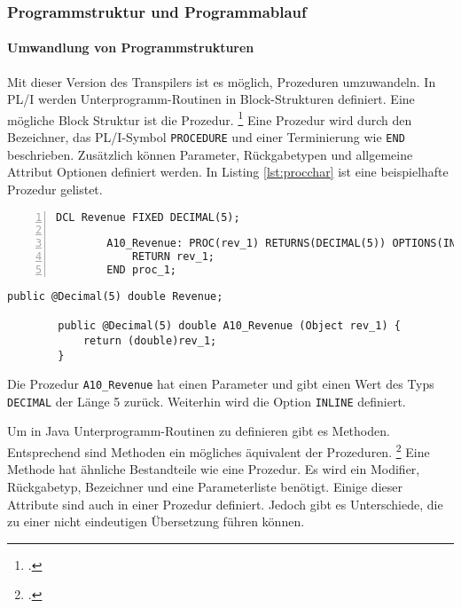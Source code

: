 \pagebreak
\subsubsection{Programmstruktur und Programmablauf}
\paragraph{Umwandlung von Programmstrukturen }\label{programstruct}

Mit dieser Version des Transpilers ist es möglich, Prozeduren umzuwandeln.
In PL/I werden Unterprogramm-Routinen in Block-Strukturen definiert. Eine mögliche Block Struktur ist die Prozedur. \footcite[Vgl. ][S. 97ff. ]{pliref}
Eine Prozedur wird durch den Bezeichner, das PL/I-Symbol \verb+PROCEDURE+ und einer Terminierung wie \verb+END+ beschrieben.
Zusätzlich können Parameter, Rückgabetypen und allgemeine Attribut Optionen definiert werden. In Listing \ref{lst:procchar} ist eine beispielhafte Prozedur gelistet.

\begin{minipage}[b]{0.5\linewidth}
	\centering
	\lstset{language=PL/I,label=SliceExaple}
	\begin{lstlisting}[frame=single, numbers=left, mathescape,%
		caption={Transformation DECIMAL}, label={lst:procchar}]
		DCL Revenue FIXED DECIMAL(5);

		A10_Revenue: PROC(rev_1) RETURNS(DECIMAL(5)) OPTIONS(INLINE);
			RETURN rev_1;
		END proc_1;
	\end{lstlisting}
\end{minipage}
\hspace{0.5cm}
\begin{minipage}[b]{0.5\linewidth}
	\centering
	\lstset{language=Java,label=SliceExaple}
	\begin{lstlisting}[frame=single, mathescape,%
		title={}]
		public @Decimal(5) double Revenue;
		
		public @Decimal(5) double A10_Revenue (Object rev_1) { 
			return (double)rev_1;
		}
	\end{lstlisting}
\end{minipage}

Die Prozedur \verb+A10_Revenue+ hat einen Parameter und gibt einen Wert des Typs \verb+DECIMAL+ der L\"ange 5 zur\"uck.
Weiterhin wird die Option \verb+INLINE+ definiert.

Um in Java Unterprogramm-Routinen zu definieren gibt es Methoden. 
Entsprechend sind Methoden ein mögliches äquivalent der Prozeduren. \footcite[Vgl. ][]{oracle}
Eine Methode hat ähnliche Bestandteile wie eine Prozedur.
Es wird ein Modifier, Rückgabetyp, Bezeichner und eine Parameterliste benötigt.
Einige dieser Attribute sind auch in einer Prozedur definiert.
Jedoch gibt es Unterschiede, die zu einer nicht eindeutigen Übersetzung führen können.

